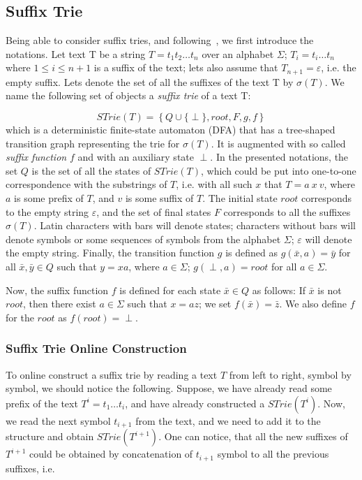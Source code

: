 \documentclass[paper=a4, fontsize=11pt]{scrartcl} %
\numberwithin{equation}{section} %
\numberwithin{figure}{section} %
\numberwithin{table}{section} %
\begin{document}
\subsection{Suffix Trie}
\par Being able to consider suffix tries, and following~\cite{ukkonen1995line}, we first introduce the notations. Let text T be a string $T = t_1 t_2 \dots t_n$ over an alphabet $\Sigma$; $T_i = t_i \dots t_n$ where $1 \leq i \leq n+1$ is a suffix of the text; lets also assume that $T_{n+1} = \varepsilon$, i.e. the empty suffix. Lets denote the set of all the suffixes of the text T by $\sigma(T)$. We name the following set of objects a \textit{suffix trie} of a text T:

\begin{equation}
STrie(T) = \left\{Q \cup \{\perp\}, root, F, g, f \right\}
\end{equation}
which is a deterministic finite-state automaton (DFA) that has a tree-shaped transition graph representing the trie for $\sigma(T)$. It is augmented with so called \textit{suffix function} $f$ and with an auxiliary state $\perp$. In the presented notations, the set $Q$ is the set of all the states of $STrie(T)$, which could be put into one-to-one correspondence with the substrings of $T$, i.e. with all such $x$ that $T = a\ x\ v$, where $a$ is some prefix of $T$, and $v$ is some suffix of $T$. The initial state $root$ corresponds to the empty string $\varepsilon$, and the set of final states $F$ corresponds to all the suffixes $\sigma(T)$. Latin characters with bars will denote states; characters without bars will denote symbols or some sequences of symbols from the alphabet $\Sigma$; $\varepsilon$ will denote the empty string. Finally, the transition function $g$ is defined as $g(\bar{x}, a) = \bar{y}$ for all $\bar{x}, \bar{y} \in Q$ such that $y = xa$, where $a \in \Sigma$; $g(\perp, a) = root$ for all $a \in \Sigma$.

\par Now, the suffix function $f$ is defined for each state $\bar{x} \in Q$ as follows: If $\bar{x}$ is not $root$, then there exist $a \in \Sigma$ such that $x = az$; we set $f(\bar{x}) = \bar{z}$. We also define $f$ for the $root$ as $f(root) = \perp$.

\subsubsection{Suffix Trie Online Construction}
\par To online construct a suffix trie by reading a text $T$ from left to right, symbol by symbol, we should notice the following. Suppose, we have already read some prefix of the text $T^i = t_1 \dots t_i$, and have already constructed a $STrie(T^i)$. Now, we read the next symbol $t_{i+1}$ from the text, and we need to add it to the structure and obtain $STrie(T^{i+1})$. One can notice, that all the new suffixes of $T^{i+1}$ could be obtained by concatenation of $t_{i+1}$ symbol to all the previous suffixes, i.e.
\end{document}
